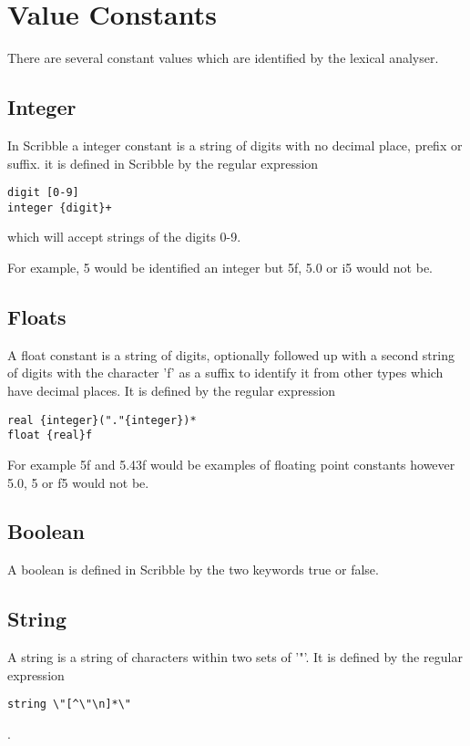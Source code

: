 \documentclass[]{final_report}
\begin{document}
\section{Value Constants}

There are several constant values which are identified by the lexical analyser.

\subsection{Integer}

In Scribble a integer constant is a string of digits with no decimal place, prefix or suffix. it is defined in Scribble by the regular expression 

\begin{verbatim}
digit [0-9]
integer {digit}+
\end{verbatim}

which will accept strings of the digits 0-9.

For example, 5 would be identified an integer but 5f, 5.0 or i5 would not be.

\subsection{Floats}

A float constant is a string of digits, optionally followed up with a second string of digits with the character 'f' as a suffix to identify it from other types which have decimal places. It is defined by the regular expression
\begin{verbatim}
real {integer}("."{integer})*
float {real}f
\end{verbatim}

For example 5f and 5.43f would be examples of floating point constants however 5.0, 5 or f5 would not be.

\subsection{Boolean}

A boolean is defined in Scribble by the two keywords true or false.

\subsection{String}

A string is a string of characters within two sets of '"'. It is defined by the regular expression \begin{verbatim}
string \"[^\"\n]*\"
\end{verbatim}.
\end{document}
